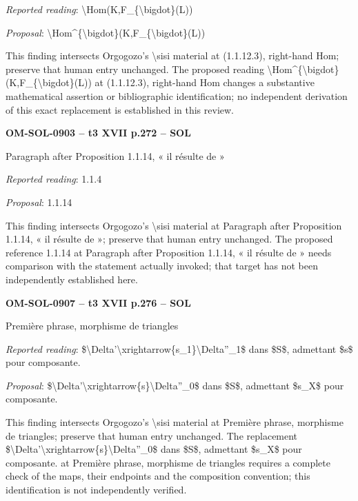 \emph{Reported reading}: \textbackslash{}Hom(K,F\_\{\textbackslash{}bigdot\}(L))\par
\emph{Proposal}: \textbackslash{}Hom\textasciicircum{}\{\textbackslash{}bigdot\}(K,F\_\{\textbackslash{}bigdot\}(L))\par
This finding intersects Orgogozo's \textbackslash{}sisi material at (1.1.12.3), right-hand Hom; preserve that human entry unchanged. The proposed reading \textbackslash{}Hom\textasciicircum{}\{\textbackslash{}bigdot\}(K,F\_\{\textbackslash{}bigdot\}(L)) at (1.1.12.3), right-hand Hom changes a substantive mathematical assertion or bibliographic identification; no independent derivation of this exact replacement is established in this review.\par
\par\noindent\textbf{OM-SOL-0903 -- t3 XVII p.272 -- SOL}\par
Paragraph after Proposition 1.1.14, « il résulte de »\par
\emph{Reported reading}: 1.1.4\par
\emph{Proposal}: 1.1.14\par
This finding intersects Orgogozo's \textbackslash{}sisi material at Paragraph after Proposition 1.1.14, « il résulte de »; preserve that human entry unchanged. The proposed reference 1.1.14 at Paragraph after Proposition 1.1.14, « il résulte de » needs comparison with the statement actually invoked; that target has not been independently established here.\par
\par\noindent\textbf{OM-SOL-0907 -- t3 XVII p.276 -- SOL}\par
Première phrase, morphisme de triangles\par
\emph{Reported reading}: \$\textbackslash{}Delta'\textbackslash{}xrightarrow\{s\_1\}\textbackslash{}Delta''\_1\$ dans \$S\$, admettant \$s\$ pour composante.\par
\emph{Proposal}: \$\textbackslash{}Delta'\textbackslash{}xrightarrow\{s\}\textbackslash{}Delta''\_0\$ dans \$S\$, admettant \$s\_X\$ pour composante.\par
This finding intersects Orgogozo's \textbackslash{}sisi material at Première phrase, morphisme de triangles; preserve that human entry unchanged. The replacement \$\textbackslash{}Delta'\textbackslash{}xrightarrow\{s\}\textbackslash{}Delta''\_0\$ dans \$S\$, admettant \$s\_X\$ pour composante. at Première phrase, morphisme de triangles requires a complete check of the maps, their endpoints and the composition convention; this identification is not independently verified.\par
